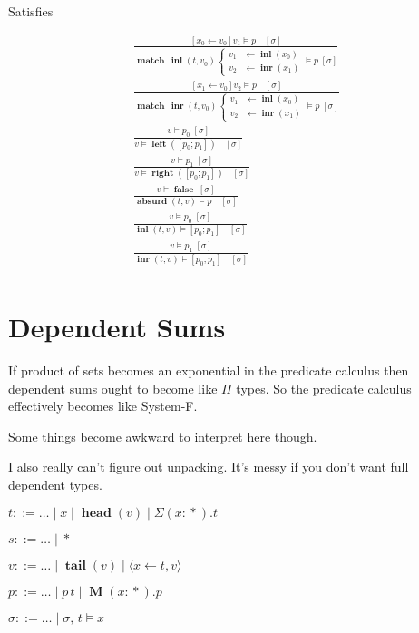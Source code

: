 \documentclass[twocolumn, fleqn]{scrartcl}
\newcommand{\bnfdef}{\mathbin{::=}}
\DeclareMathOperator{\absurd}{\textbf{absurd}}
\DeclareMathOperator{\inl}{\textbf{inl}}
\DeclareMathOperator{\inr}{\textbf{inr}}
\DeclareMathOperator{\false}{\textbf{false}}
\DeclareMathOperator{\lft}{\textbf{left}}
\DeclareMathOperator{\rgt}{\textbf{right}}
\DeclareMathOperator{\prop}{*}
\DeclareMathOperator{\head}{\textbf{head}}
\DeclareMathOperator{\tail}{\textbf{tail}}
\DeclareMathOperator{\Mu}{\textbf{M}}
\DeclareMathOperator{\update}{\leftarrow}
\DeclareMathOperator{\case}{\textbf{match}}
\begin{document}
Satisfies

\begin{multline*}
\frac{
  [x_0 \update v_0] v_1 \models p \quad [\sigma]
}{
  \case \, \inl(t, v_0) \,
  \begin{cases}
    v_1 & \leftarrow \inl(x_0) \\
    v_2 & \leftarrow \inr(x_1)
  \end{cases}
 \models p \; [\sigma]
}\\
\frac{
  [x_1 \update v_0] v_2 \models p \quad [\sigma]
}{
  \case \, \inr(t, v_0) \,
  \begin{cases}
    v_1 & \leftarrow \inl(x_0) \\
    v_2 & \leftarrow \inr(x_1)
  \end{cases}
  \models p \; [\sigma]
}\\
\frac{
  v \models p_0 \; [\sigma]
}{
  v \models \lft([ p_0 ; p_1 ]) \quad [\sigma]
}\\
\frac{
  v \models p_1 \; [\sigma]
}{
  v \models \rgt([ p_0 ; p_1 ]) \quad [\sigma]
}\\
\frac{
  v \models \false \; [\sigma]
}{
  \absurd(t, v) \models p \quad [\sigma]
}\\
\frac{
  v \models p_0 \; [\sigma]
}{
  \inl(t, v) \models [ p_0 ; p_1 ] \quad [\sigma]
}\\
\frac{
  v \models p_1 \; [\sigma]
}{
  \inr(t, v) \models [ p_0 ; p_1 ] \quad [\sigma]
}\\
\end{multline*}

\section*{Dependent Sums}

If product of sets becomes an exponential in the predicate calculus
then dependent sums ought to become like \(\Pi\) types.  So the
predicate calculus effectively becomes like System-F.

Some things become awkward to interpret here though.

I also really can't figure out unpacking. It's messy if you don't want
full dependent types.

\begin{description}[nosep]
\item[Types] \hfill \( t \bnfdef \ldots \mid x \mid \head(v) \mid \Sigma (x \colon \prop). t \)
\item[Sorts] \hfill \( s \bnfdef \ldots \mid \prop \)
\item[Values] \hfill \( v \bnfdef \ldots \mid \tail(v) \mid \langle x \update t , v \rangle \)
\item[Predicates] \hfill \( p \bnfdef \ldots \mid p \, t \mid \Mu (x \colon \prop). p \)
\item[Substitutions] \hfill \( \sigma \bnfdef \ldots \mid \sigma , \, t \models x \)
\end{description}
\end{document}
